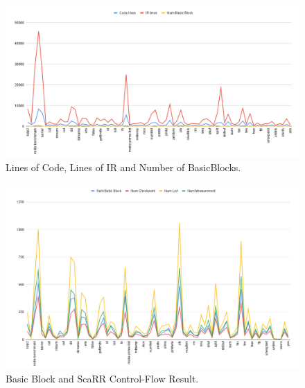 \begin{figure}[htbp]
    \centerline{\includegraphics[scale=.55]{Figures/05/code-lines-chart.png}}
    \caption{Lines of Code, Lines of IR and Number of BasicBlocks.} 
    \label{fig:code-lines-chart}
\end{figure}

\begin{figure}[htbp]
    \centerline{\includegraphics[scale=.55]{Figures/05/bb-chart.png}}
    \caption{Basic Block and ScaRR Control-Flow Result.} 
    \label{fig:bb-chart}
\end{figure}

